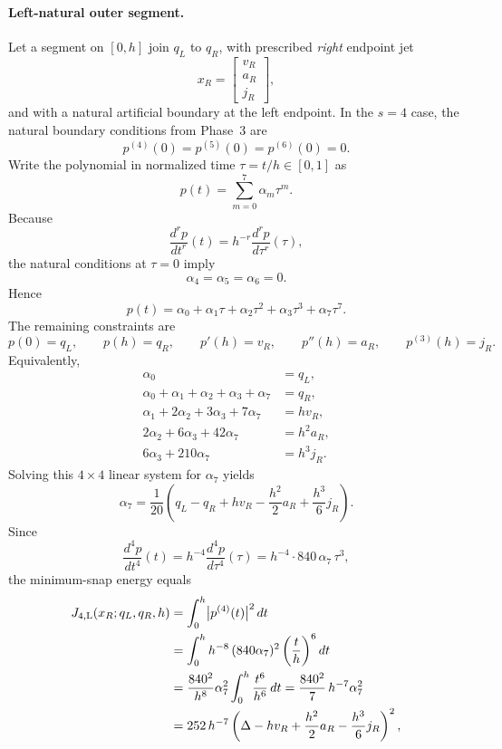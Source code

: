\paragraph{Left-natural outer segment.}
Let a segment on \([0,h]\) join \(q_L\) to \(q_R\), with prescribed \emph{right} endpoint jet
\[
x_R=
\begin{bmatrix}
v_R\\ a_R\\ j_R
\end{bmatrix},
\]
and with a natural artificial boundary at the left endpoint.
In the \(s=4\) case, the natural boundary conditions from Phase~3 are
\[
p^{(4)}(0)=p^{(5)}(0)=p^{(6)}(0)=0.
\]
Write the polynomial in normalized time \(\tau=t/h\in[0,1]\) as
\[
p(t)=\sum_{m=0}^{7}\alpha_m \tau^m.
\]
Because
\[
\frac{d^r p}{dt^r}(t)=h^{-r}\frac{d^r p}{d\tau^r}(\tau),
\]
the natural conditions at \(\tau=0\) imply
\[
\alpha_4=\alpha_5=\alpha_6=0.
\]
Hence
\[
p(t)=\alpha_0+\alpha_1\tau+\alpha_2\tau^2+\alpha_3\tau^3+\alpha_7\tau^7.
\]
The remaining constraints are
\[
p(0)=q_L,
\qquad
p(h)=q_R,
\qquad
p'(h)=v_R,
\qquad
p''(h)=a_R,
\qquad
p^{(3)}(h)=j_R.
\]
Equivalently,
\begin{align*}
\alpha_0 &= q_L,\\
\alpha_0+\alpha_1+\alpha_2+\alpha_3+\alpha_7 &= q_R,\\
\alpha_1+2\alpha_2+3\alpha_3+7\alpha_7 &= h v_R,\\
2\alpha_2+6\alpha_3+42\alpha_7 &= h^2 a_R,\\
6\alpha_3+210\alpha_7 &= h^3 j_R.
\end{align*}
Solving this \(4\times 4\) linear system for \(\alpha_7\) yields
\begin{equation}
\label{eq:phase4_alpha7_left}
\alpha_7
=
\frac{1}{20}
\left(
q_L-q_R+h v_R-\frac{h^2}{2}a_R+\frac{h^3}{6}j_R
\right).
\end{equation}
Since
\[
\frac{d^4p}{dt^4}(t)=h^{-4}\frac{d^4p}{d\tau^4}(\tau)
=
h^{-4}\cdot 840\,\alpha_7\,\tau^3,
\]
the minimum-snap energy equals
\begin{align}
J_{4,\mathrm{L}}(x_R;q_L,q_R,h)
&=
\int_0^h \bigl|p^{(4)}(t)\bigr|^2\,dt \notag\\
&=
\int_0^h h^{-8}\,(840\alpha_7)^2\left(\frac{t}{h}\right)^6 dt \notag\\
&=
\frac{840^2}{h^8}\alpha_7^2 \int_0^h \frac{t^6}{h^6}\,dt
=
\frac{840^2}{7}\,h^{-7}\alpha_7^2 \notag\\
&=
252\,h^{-7}
\left(
\Delta - h v_R + \frac{h^2}{2}a_R - \frac{h^3}{6}j_R
\right)^2,
\label{eq:phase4_left_natural_cost}
\end{align}
